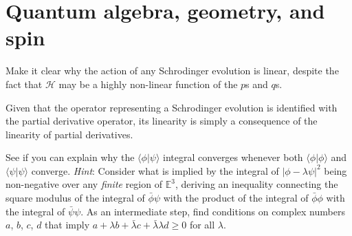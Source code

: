 \documentclass[../road-to-reality.tex]{subfiles}
\begin{document}
\printanswers

\section{Quantum algebra, geometry, and spin}

\begin{questions}

\question Make it clear why the action of any Schrodinger evolution is linear, despite the fact that $\mathcal{H}$ may be a highly non-linear function of the $p$s and $q$s.

\begin{solution}
	Given that the operator representing a Schrodinger evolution is identified with the partial derivative operator, its linearity is simply a consequence of the linearity of partial derivatives. 
\end{solution}

\question See if you can explain why the $\langle\phi|\psi\rangle$ integral converges whenever both $\langle\phi|\phi\rangle$ and $\langle\psi|\psi\rangle$ converge. \textit{Hint}: Consider what is implied by the integral of $|\phi - \lambda\psi|^2$ being non-negative over any \textit{finite} region of $\mathbb{E}^3$, deriving an inequality connecting the square modulus of the integral of $\bar{\phi}\psi$ with the product of the integral of $\bar{\phi}\phi$ with the integral of $\bar{\psi}\psi$. As an intermediate step, find conditions on complex numbers $a$, $b$, $c$, $d$ that imply $a + \lambda{b} + \bar{\lambda}c + \bar{\lambda}\lambda{d}\geq0$ for all $\lambda$.


\end{questions}
\end{document}
